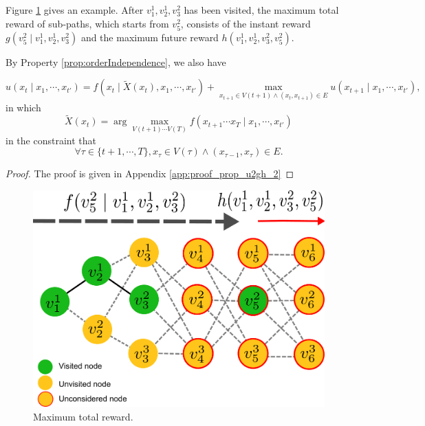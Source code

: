 \documentclass[12pt]{article}
\begin{document}
Figure \ref{fig:DefineFuncP} gives an example.
After $ v^{1}_{1}, v^{1}_{2} , v^{2}_{3} $ has been visited, the maximum total reward of sub-paths, which starts from $ v^{2}_{5} $, consists of the instant reward $ g( v^{2}_{5} \mid v^{1}_{1}, v^{1}_{2} , v^{2}_{3} ) $ and the maximum future reward $ h( v^{1}_{1}, v^{1}_{2} , v^{2}_{3}, v^{2}_{5} ) $.

By Property \ref{prop:orderIndependence}, we also have
\begin{propty}
\label{prop:u2gh_2}
\begin{equation}
\label{eq:u2gh_2:0}
u( x_{t} \mid x_{1} , \cdots , x_{t'} ) = f( x_{t} \mid \tilde{X}(x_{t}), x_{1} , \cdots , x_{t'} ) +  \max_{x_{t+1} \in V(t+1) \land ( x_{t}, x_{t+1} ) \in E} u( x_{t+1} \mid x_{1} , \cdots , x_{t'} ),
\end{equation}
in which
\begin{equation}
\label{eq:u2gh_2:1}
\tilde{X}(x_{t}) = \arg \max_{ V(t+1) \cdots V(T) } f( x_{t+1} \cdots x_{T} \mid x_{1} , \cdots , x_{t'} )
\end{equation}
in the constraint that
\begin{equation}
\label{eq:u2gh_2:1:constraint}
\forall \tau \in \{ t+1 , \cdots , T \},  x_{ \tau } \in V( \tau ) \land ( x_{ \tau-1 }, x_{ \tau } ) \in E .
\end{equation}
\begin{proof}
The proof is given in Appendix \ref{app:proof_prop_u2gh_2}
\end{proof}
\end{propty}

\begin{figure}
\centering
\includegraphics[width=0.5\linewidth]{./images/DefineFuncP.pdf}
\caption{Maximum total reward.}
\label{fig:DefineFuncP}
\end{figure}
\end{document}
